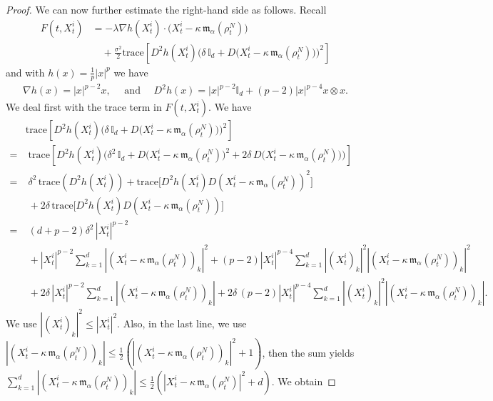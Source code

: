 \documentclass[12pt]{amsart}
\numberwithin{equation}{section}
\begin{document}
\begin{proof}
We can now further estimate the right-hand side as follows. Recall
\begin{align*}
    F(t,X^{i}_{t}) 
     &= -\lambda \nabla h(X^{i}_{t})\cdot \big(X^{i}_{t} - \kappa \, \mathfrak{m}_{\alpha}(\rho^{N}_{t})\big) \\
     &\quad+ \frac{\sigma^{2}}{2} \text{trace}\left[D^{2}h(X^{i}_{t}) \bigg( \delta\,\mathds{I}_{d} + D\big(X^{i}_{t} - \kappa\,\mathfrak{m}_{\alpha}(\rho^{N}_{t})\big) \bigg)^{2} \right]
\end{align*}
and with $h(x)=\frac{1}{p}|x|^{p}$ we have
\begin{align*}
    \nabla h(x) = |x|^{p-2}x, \quad \text{ and } \quad D^{2}h(x) = |x|^{p-2}\mathds{I}_{d} + (p-2)|x|^{p-4}x\otimes x.
\end{align*}
We deal first with the trace term in $F(t,X^{i}_{t})$. We have
\begin{align*}
    & %
    \text{trace}\left[D^{2}h(X^{i}_{t}) \bigg( \delta\,\mathds{I}_{d} + D\big(X^{i}_{t} - \kappa\,\mathfrak{m}_{\alpha}(\rho^{N}_{t})\big) \bigg)^{2} \right]\\
    =&\; \text{trace}\left[D^{2}h(X^{i}_{t}) \bigg( \delta^{2}\,\mathds{I}_{d} + D\big(X^{i}_{t} - \kappa\,\mathfrak{m}_{\alpha}(\rho^{N}_{t})\big)^{2} + 2\delta\, D\big(X^{i}_{t} - \kappa\,\mathfrak{m}_{\alpha}(\rho^{N}_{t})\big)\bigg) \right]\\
    =&\; \delta^{2}\,\text{trace}(D^{2}h(X^{i}_{t})) + \text{trace}\big[ D^{2}h(X^{i}_{t})D(X^{i}_{t} - \kappa\,\mathfrak{m}_{\alpha}(\rho^{N}_{t}))^{2}\big]\\
    &\;  + 2\delta\,\text{trace}\big[D^{2}h(X^{i}_{t})D(X^{i}_{t} - \kappa\,\mathfrak{m}_{\alpha}(\rho^{N}_{t}))\big]\\
    =&\;  (d+p-2)\delta^{2}\,|X^{i}_{t}|^{p-2} \\
    & \; +  |X^{i}_{t}|^{p-2} \sum\limits_{k=1}^{d} |(X^{i}_{t} - \kappa\,\mathfrak{m}_{\alpha}(\rho^{N}_{t}))_{k}|^{2} + (p-2) |X^{i}_{t}|^{p-4} \sum\limits_{k=1}^{d}|(X^{i}_{t})_{k}|^{2} |(X^{i}_{t} - \kappa\,\mathfrak{m}_{\alpha}(\rho^{N}_{t}) )_{k}|^{2}\\
    &\; + 2\delta\, |X^{i}_{t}|^{p-2} \sum\limits_{k=1}^{d}|(X^{i}_{t} - \kappa\, \mathfrak{m}_{\alpha}(\rho^{N}_{t}))_{k}| + 2\delta\,(p-2)|X^{i}_{t}|^{p-4} \sum\limits_{k=1}^{d} |(X^{i}_{t})_{k}|^{2} |(X^{i}_{t} - \kappa\,\mathfrak{m}_{\alpha}(\rho^{N}_{t}))_{k}|.
\end{align*}
We use $ |(X^{i}_{t})_{k}|^{2} \leq |X^{i}_{t}|^{2}$. Also, in the last line, we use $|(X^{i}_{t} - \kappa\, \mathfrak{m}_{\alpha}(\rho^{N}_{t}))_{k}| \leq \frac{1}{2}(|(X^{i}_{t} - \kappa\, \mathfrak{m}_{\alpha}(\rho^{N}_{t}))_{k}|^{2} + 1)$, then the sum yields $\sum\limits_{k=1}^{d}|(X^{i}_{t} - \kappa\, \mathfrak{m}_{\alpha}(\rho^{N}_{t}))_{k}| \leq \frac{1}{2}(|X^{i}_{t} - \kappa\, \mathfrak{m}_{\alpha}(\rho^{N}_{t})|^{2} + d)$.  We obtain

\end{proof}
\end{document}
